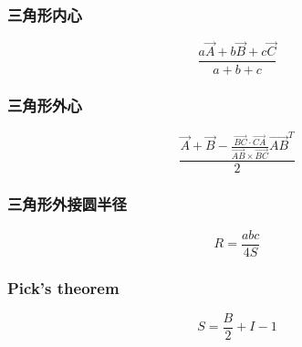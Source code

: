 \subsubsection{三角形内心}
	\vspace{-2em}
	\[ \frac{a\vec {A} + b\vec{B} + c\vec{C}}{a + b + c} \]
\subsubsection{三角形外心}
	\vspace{-2em}
	\[ \frac{\vec{A} + \vec{B} - \frac{\overrightarrow {BC} \cdot \overrightarrow{CA}}{\overrightarrow {AB} \times \overrightarrow{BC}}\overrightarrow {AB}^T}{2} \]
\subsubsection{三角形外接圆半径}
	\vspace{-2em}
	\[ R = \frac{abc}{4S} \]
\subsubsection{Pick's theorem}
	\vspace{-2em}
	\[ S = \frac{B}{2} + I - 1 \]
